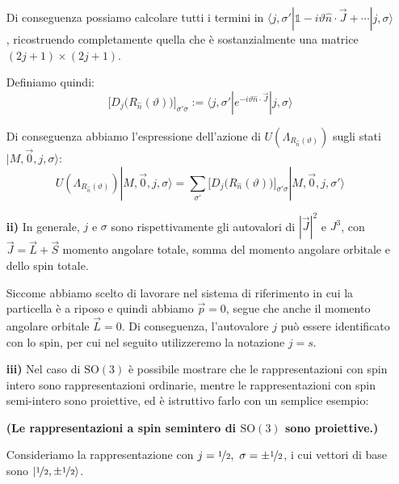 \documentclass[../main.tex]{subfiles}
\begin{document}
\begin{enumerate}
    Di conseguenza possiamo calcolare tutti i termini in \(\langle j, \sigma' | \mathbb 1 -i\vartheta \hat{n}\cdot \Vec{J} + \cdots| j, \sigma\rangle\), ricostruendo completamente quella che è sostanzialmente una matrice $(2j+1)\times(2j+1)$.

    Definiamo quindi:
    \begin{equation}
        \Big[D_j\big(R_{\hat{n}}(\vartheta)\big)\Big]_{\sigma'\sigma} := \langle j, \sigma' | e^{-i\vartheta \hat{n}\cdot \Vec{J}}| j, \sigma\rangle
        \label{eq:sandwich_group_elem}
    \end{equation}

    Di conseguenza abbiamo l'espressione dell'azione di $U(\Lambda_{R_{\hat{n}}(\vartheta)})$ sugli stati $|M, \Vec{0}, j, \sigma\rangle$:
    \begin{equation}
         \boxed{U(\Lambda_{R_{\hat{n}}(\vartheta)})|M, \Vec{0}, j, \sigma\rangle  =  \sum_{\sigma'}\Big[D_j\big(R_{\hat{n}}(\vartheta)\big)\Big]_{\sigma'\sigma}|M, \Vec{0}, j, \sigma'\rangle }
        \label{eq:rotation_operator_action}
    \end{equation}
    
    \item[\textbf{ii)}] In generale, $j$ e $\sigma$ sono rispettivamente gli autovalori di $|\Vec J|^2$ e $J^3$, con $\Vec{J} = \Vec{L}+\Vec{S}$ momento angolare totale, somma del momento angolare orbitale e dello spin totale. 
    
    Siccome abbiamo scelto di lavorare nel sistema di riferimento in cui la particella è a riposo e quindi abbiamo $\Vec{p} = 0$, segue che anche il momento angolare orbitale $\Vec{L} = 0$. Di conseguenza, l'autovalore $j$ può essere identificato con lo spin, per cui nel seguito utilizzeremo la notazione $j=s$.
    
    \item[\textbf{iii)}] Nel caso di $\text{SO}(3)$ è possibile mostrare che le rappresentazioni con spin intero sono rappresentazioni ordinarie, mentre le rappresentazioni con spin semi-intero sono proiettive, ed è istruttivo farlo con un semplice esempio:

    \begin{example}
        \textbf{(Le rappresentazioni a spin semintero di $\text{SO}(3)$ sono proiettive.)}

        Consideriamo la rappresentazione con \(j=\nicefrac{1}{2}, ~\sigma = \pm\nicefrac{1}{2}\), i cui vettori di base sono \(| \nicefrac{1}{2}, \pm \nicefrac{1}{2}\rangle\).


\end{example}
\end{enumerate}
\end{document}
